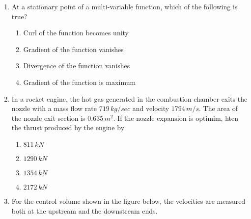 \documentclass[journal]{IEEEtran}
\begin{document}
\begin{enumerate}
    \begin{enumerate}
        \item $\tau_{xz}=\frac{V_z}{2I_y}\frac{z}{\brak{\frac{h}{2}}}$
        \item $\tau_{xz}=\frac{V_z\brak{\frac{h}{2}}^2}{2I_y}\brak{1-\frac{z^2}{\brak{\frac{h}{2}}^2}}$
        \item $\tau_{xz}=\frac{V_z}{2I_y}\brak{\frac{z}{\brak{\frac{h}{2}}}}^2$
        \item $\tau{_xz}=\frac{V_z\brak{\frac{h}{2}}^2}{2I_y}$
    \end{enumerate}
    \item At a stationary point of a multi-variable function, which of the following is true?
    \begin{enumerate}
        \item Curl of the function becomes unity
        \item Gradient of the function vanishes
        \item Divergence of the function vanishes
        \item Gradient of the function is maximum
    \end{enumerate}
    \item In a rocket engine, the hot gas generated in the combustion chamber exits the nozzle with a mass flow rate $719\,kg/sec$ and velocity $1794\,m/s$. The area of the nozzle exit section is $0.635\,m^2$. If the nozzle expansion is optimim, hten the thrust produced by the engine by
        \begin{enumerate}
            \item $811\, kN$
            \item $1290\, kN$
            \item $1354\, kN$
            \item $2172\, kN$
        \end{enumerate}
    \item For the control volume shown in the figure below, the velocities are measured both at the upstream and the downstream ends.


\end{enumerate}
\end{document}
